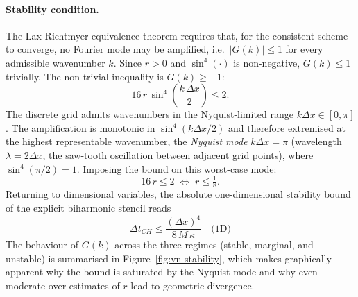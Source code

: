 \paragraph{Stability condition.} The Lax-Richtmyer equivalence theorem requires that, for the consistent scheme to converge, no Fourier mode may be amplified, i.e.\ $|G(k)| \leq 1$ for every admissible wavenumber $k$. Since $r > 0$ and $\sin^4(\cdot)$ is non-negative, $G(k) \leq 1$ trivially.
The non-trivial inequality is $G(k) \geq -1$:
\begin{equation}
    16\,r\,\sin^4\!\!\left(\frac{k\,\Delta x}{2}\right) \leq 2.
\end{equation}
The discrete grid admits wavenumbers in the Nyquist-limited range $k\Delta x \in [0, \pi]$.
The amplification is monotonic in $\sin^4(k\Delta x/2)$ and therefore extremised at the highest representable wavenumber, the \emph{Nyquist mode} $k\Delta x = \pi$ (wavelength $\lambda = 2\Delta x$, the saw-tooth oscillation between adjacent grid points), where $\sin^4(\pi/2) = 1$.
Imposing the bound on this worst-case mode:
\begin{equation}
    16\,r \leq 2 \;\Longleftrightarrow\; r \leq \tfrac{1}{8}.
\end{equation}
Returning to dimensional variables, the absolute one-dimensional stability bound of the explicit biharmonic stencil reads
\begin{equation}
    \boxed{\;\Delta t_{CH} \leq \frac{(\Delta x)^4}{8\,M\,\kappa} \quad \text{(1D)}\;}
\end{equation}
The behaviour of $G(k)$ across the three regimes (stable, marginal, and unstable) is summarised in Figure~\ref{fig:vn-stability}, which makes graphically apparent why the bound is saturated by the Nyquist mode and why even moderate over-estimates of $r$ lead to geometric divergence.

